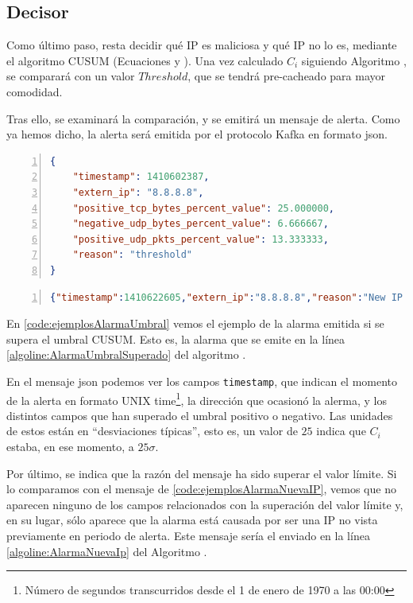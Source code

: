\subsection{Decisor}
Como último paso, resta decidir qué IP es maliciosa y qué IP no lo es, mediante el algoritmo \gls{CUSUM} 
(Ecuaciones  y ). Una vez calculado $C_i$ siguiendo Algoritmo 
, se comparará con un valor $Threshold$, que se tendrá pre-cacheado para mayor comodidad.

Tras ello, se examinará la comparación, y se emitirá un mensaje de alerta. Como ya hemos dicho, la 
alerta será emitida por el protocolo Kafka en formato \gls{json}.

\begin{lstlisting}[language=json,caption={Ejemplo de alarma por umbral superado}, breaklines=true, 
label=code:ejemplosAlarmaUmbral,numbers=left,float=htbp]
{
	"timestamp": 1410602387, 
	"extern_ip": "8.8.8.8", 
	"positive_tcp_bytes_percent_value": 25.000000,
	"negative_udp_bytes_percent_value": 6.666667, 
	"positive_udp_pkts_percent_value": 13.333333, 
	"reason": "threshold"
}
\end{lstlisting}

\begin{lstlisting}[language=json,caption={Ejemplo de alarma por nueva IP}, breaklines=true, 
label=code:ejemplosAlarmaNuevaIP,numbers=left,float=htbp]
{"timestamp":1410622605,"extern_ip":"8.8.8.8","reason":"New IP in alarm time"}
\end{lstlisting}


En \lstlistingname{} \ref{code:ejemplosAlarmaUmbral} vemos el ejemplo de la alarma emitida si se supera el umbral 
\gls{CUSUM}. Esto es, la alarma que se emite en la línea \ref{algoline:AlarmaUmbralSuperado} del algoritmo 
.

En el mensaje \gls{json} podemos ver los campos \texttt{timestamp}, que indican el momento 
de la alerta en formato UNIX time\footnote{Número de segundos transcurridos desde el 1 de enero de 1970 
a las 00:00}, la dirección que ocasionó la alerma, y los distintos campos que han superado el umbral positivo o 
negativo. Las unidades de estos están en ``desviaciones típicas'', esto es, un valor de $25$ indica que $C_i$ estaba, en 
ese momento, a $25\sigma$.

Por último, se indica que la razón del mensaje ha sido superar el valor límite. Si lo comparamos con el mensaje de 
\lstlistingname{} \ref{code:ejemplosAlarmaNuevaIP}, vemos que no aparecen ninguno de los campos relacionados con la 
superación del valor límite y, en su lugar, sólo aparece que la alarma está causada por ser una \gls{IP} no vista 
previamente en periodo de alerta. Este mensaje sería el enviado en la línea \ref{algoline:AlarmaNuevaIp} del Algoritmo
.

